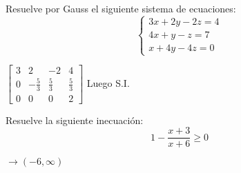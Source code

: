 \documentclass[spanish, 11pt]{exam}
\begin{document}
\begin{questions}
\question[2] Resuelve por Gauss el siguiente sistema de ecuaciones:
\[
\begin{cases}
3x + 2y - 2z = 4 \\
4x + y - z = 7 \\
x + 4y - 4z = 0
\end{cases}
\]

\begin{solution}
$\left[\begin{matrix}3 & 2 & -2 & 4\\0 & - \frac{5}{3} & \frac{5}{3} & \frac{5}{3}\\0 & 0 & 0 & 2\end{matrix}\right]$ Luego S.I.
\end{solution}

\question[1] Resuelve la siguiente inecuación: $$1-\frac{{x + 3}}{{x + 6}} \geq 0 $$ \begin{solution} $\rightarrow \left(-6, \infty\right)$\end{solution}




\end{questions}
\end{document}
